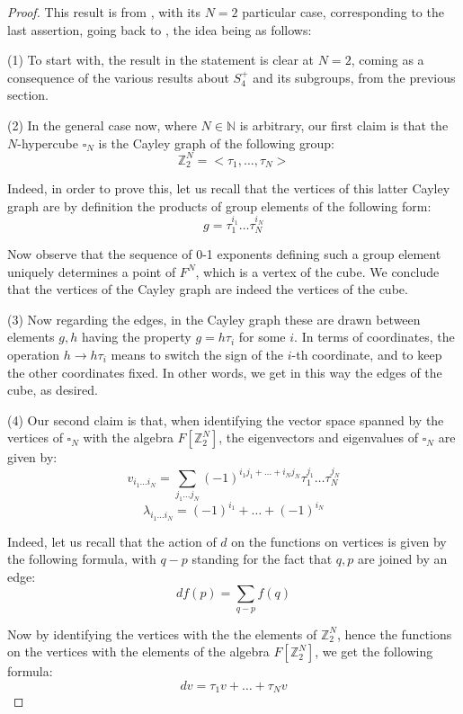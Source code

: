 \documentclass[12pt]{amsbook}
\begin{document}
\begin{proof}
This result is from \cite{bbc}, with its $N=2$ particular case, corresponding to the last assertion, going back to \cite{bi1}, the idea being as follows:

\medskip

(1) To start with, the result in the statement is clear at $N=2$, coming as a consequence of the various results about $S_4^+$ and its subgroups, from the previous section.

\medskip

(2) In the general case now, where $N\in\mathbb N$ is arbitrary, our first claim is that the $N$-hypercube $\square_N$ is the Cayley graph of the following group:
$$\mathbb Z_2^N=<\tau_1,\ldots ,\tau_N>$$

Indeed, in order to prove this, let us recall that the vertices of this latter Cayley graph are by definition the products of group elements of the following form:
$$g=\tau_1^{i_1}\ldots\tau_N^{i_N}$$

Now observe that the sequence of 0-1 exponents defining such a group element uniquely determines a point of $F^N$, which is a vertex of the cube. We conclude that the vertices of the Cayley graph are indeed the vertices of the cube. 

\medskip

(3) Now regarding the edges, in the Cayley graph these are drawn between elements $g,h$ having the property $g=h\tau_i$ for some $i$. In terms of coordinates, the operation $h\to h\tau_i$ means to switch the sign of the $i$-th coordinate, and to keep the other coordinates fixed. In other words, we get in this way the edges of the cube, as desired.

\medskip

(4) Our second claim is that, when identifying the vector space spanned by the vertices of $\square_N$ with the algebra $F[\mathbb Z_2^N]$, the eigenvectors and eigenvalues of $\square_N$ are given by:
$$v_{i_1\ldots i_N}=\sum_{j_1\ldots j_N} (-1)^{i_1j_1
+\ldots+i_Nj_N}\tau_1^{j_1}\ldots\tau_N^{j_N}$$
$$\lambda_{i_1\ldots i_N}=(-1)^{i_1}+\ldots +(-1)^{i_N}$$

Indeed, let us recall that the action of $d$ on the functions on vertices is given by the following formula, with $q-p$ standing for the fact that $q,p$ are joined by an edge:
$$df(p)=\sum_{q-p}f(q)$$

Now by identifying the vertices with the the elements of $\mathbb Z_2^N$, hence the functions on the vertices with the elements of the algebra
$F[\mathbb Z_2^N]$, we get the following formula:
$$dv=\tau_1v+\ldots +\tau_Nv$$


\end{proof}
\end{document}
